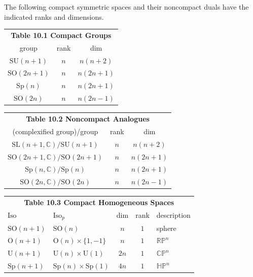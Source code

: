 \begin{definition}
  \label{def:pet-ch10-symmetric-space-tables}
  The following compact symmetric spaces and their noncompact duals have the
  indicated ranks and dimensions.
  \begin{center}
    \begin{tabular}{c|c|c}
      \multicolumn{3}{c}{\textbf{Table 10.1 Compact Groups}}\\
      group & rank & dim\\\hline
      $\mathrm{SU}(n+1)$ & $n$ & $n(n+2)$\\
      $\mathrm{SO}(2n+1)$ & $n$ & $n(2n+1)$\\
      $\mathrm{Sp}(n)$ & $n$ & $n(2n+1)$\\
      $\mathrm{SO}(2n)$ & $n$ & $n(2n-1)$
    \end{tabular}
    \qquad
    \begin{tabular}{c|c|c}
      \multicolumn{3}{c}{\textbf{Table 10.2 Noncompact Analogues}}\\
      (complexified group)/group & rank & dim\\\hline
      $\mathrm{SL}(n{+}1,\mathbb C)/\mathrm{SU}(n{+}1)$ & $n$ & $n(n+2)$\\
      $\mathrm{SO}(2n{+}1,\mathbb C)/\mathrm{SO}(2n{+}1)$ & $n$ & $n(2n+1)$\\
      $\mathrm{Sp}(n,\mathbb C)/\mathrm{Sp}(n)$ & $n$ & $n(2n+1)$\\
      $\mathrm{SO}(2n,\mathbb C)/\mathrm{SO}(2n)$ & $n$ & $n(2n-1)$
    \end{tabular}
  \end{center}
  \begin{center}
    \begin{tabular}{l|l|c|c|l}
      \multicolumn{5}{c}{\textbf{Table 10.3 Compact Homogeneous Spaces}}\\
      $\mathrm{Iso}$ & $\mathrm{Iso}_p$ & dim & rank & description\\\hline
      $\mathrm{SO}(n{+}1)$ & $\mathrm{SO}(n)$ & $n$ & $1$ & sphere\\
      $\mathrm O(n{+}1)$ & $\mathrm O(n)\times\{1,-1\}$ & $n$ & $1$ & $\mathbb{RP}^n$\\
      $\mathrm U(n{+}1)$ & $\mathrm U(n)\times\mathrm U(1)$ & $2n$ & $1$ & $\mathbb{CP}^n$\\
      $\mathrm{Sp}(n{+}1)$ & $\mathrm{Sp}(n)\times\mathrm{Sp}(1)$ & $4n$ & $1$ & $\mathbb{HP}^n$\\

\end{tabular}
\end{center}
\end{definition}
